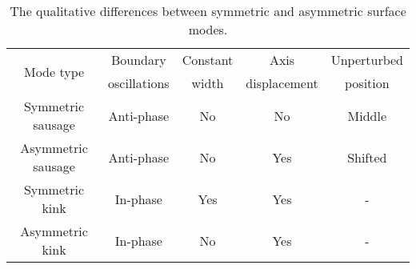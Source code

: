 \documentclass[12pt]{../style-files/ociamthesis}
\begin{document}
\begin{table}
	\centering
	\begin{tabular}{ccccc}
		\toprule
		\multirow{2}{*}{Mode type} & Boundary & Constant & Axis & Unperturbed \\
		 & oscillations & width & displacement & position \\
		\midrule
		Symmetric sausage & Anti-phase & No & No & Middle \\
		Asymmetric sausage & Anti-phase & No & Yes & Shifted \\
		Symmetric kink & In-phase & Yes & Yes & - \\
		Asymmetric kink & In-phase & No	& Yes & - \\
		\bottomrule
	\end{tabular}
	\caption{The qualitative differences between symmetric and asymmetric surface modes.}
	\label{tab: eigenmode differences}
\end{table}
\end{document}
